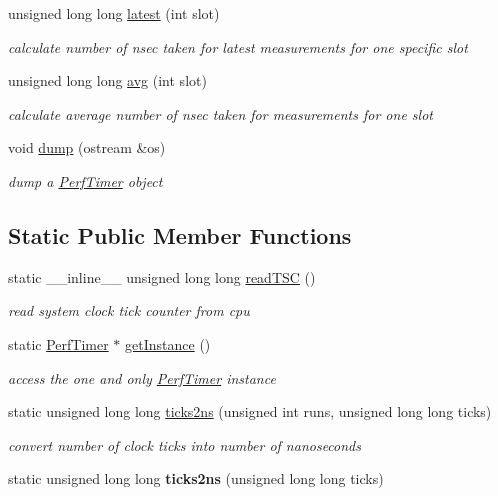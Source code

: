 \begin{DoxyCompactItemize}
unsigned long long \hyperlink{classPerfTimer_a5eef9b392152d13af1359c9bfd13c436}{latest} (int slot)
\begin{DoxyCompactList}\small\item\em calculate number of nsec taken for latest measurements for one specific slot \end{DoxyCompactList}\item 
unsigned long long \hyperlink{classPerfTimer_a1802fc2d85ce5c7ac9489d7a145099d9}{avg} (int slot)
\begin{DoxyCompactList}\small\item\em calculate average number of nsec taken for measurements for one slot \end{DoxyCompactList}\item 
\mbox{\label{classPerfTimer_a9aa64aa9c7e22d925595650d783cdb41}} 
void \hyperlink{classPerfTimer_a9aa64aa9c7e22d925595650d783cdb41}{dump} (ostream \&os)
\begin{DoxyCompactList}\small\item\em dump a \hyperlink{classPerfTimer}{Perf\+Timer} object \end{DoxyCompactList}\end{DoxyCompactItemize}
\subsection*{Static Public Member Functions}
\begin{DoxyCompactItemize}
\item 
static \+\_\+\+\_\+inline\+\_\+\+\_\+ unsigned long long \hyperlink{classPerfTimer_aaef17f123debaf55d86bd3eb4ed0de0e}{read\+T\+SC} ()
\begin{DoxyCompactList}\small\item\em read system clock tick counter from cpu \end{DoxyCompactList}\item 
\mbox{\label{classPerfTimer_a617b22bf368f30ad5664b531f019dcc0}} 
static \hyperlink{classPerfTimer}{Perf\+Timer} $\ast$ \hyperlink{classPerfTimer_a617b22bf368f30ad5664b531f019dcc0}{get\+Instance} ()
\begin{DoxyCompactList}\small\item\em access the one and only \hyperlink{classPerfTimer}{Perf\+Timer} instance \end{DoxyCompactList}\item 
static unsigned long long \hyperlink{classPerfTimer_a8da85ffde4f6f94a12c1fd9b789ded74}{ticks2ns} (unsigned int runs, unsigned long long ticks)
\begin{DoxyCompactList}\small\item\em convert number of clock ticks into number of nanoseconds \end{DoxyCompactList}\item 
\mbox{\label{classPerfTimer_a44ee31ec0675f205d160d691fed6532b}} 
static unsigned long long {\bfseries ticks2ns} (unsigned long long ticks)
\end{DoxyCompactItemize}


